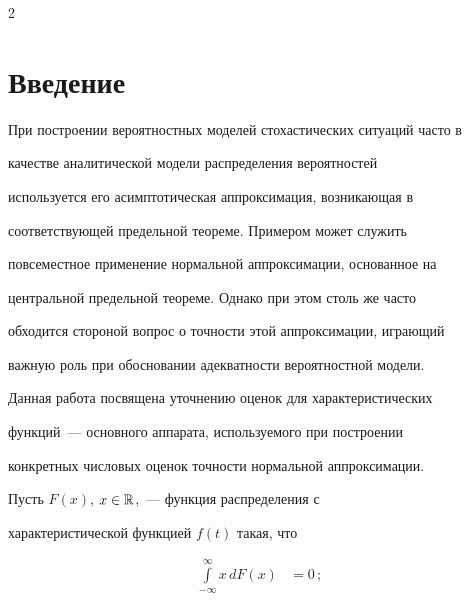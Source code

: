       \begin{multicols}{2}



      \label{st\stat}



\section{Введение}

\vspace*{6pt}



При построении вероятностных моделей стоха\-стических ситуаций часто в

качестве аналити\-ческой модели распределения вероятностей

используется его асимптотическая аппроксимация, воз\-ни\-ка\-ющая в

соответствующей предельной теореме. Примером может служить

повсеместное применение нормальной аппроксимации, основанное на

центральной предельной теореме. Однако при этом столь же часто

обходится стороной вопрос о точ\-ности этой аппроксимации, играющий

важную роль при обосновании адекватности вероятностной модели.

Данная работа посвящена уточнению оценок для характеристических

функций~--- основного аппарата, используемого при построении

конкретных числовых оценок точности нормальной аппроксимации.



Пусть $F(x)$, $x\in\mathbb R$,~--- функция распределения с

характеристической функцией $f(t)$ такая, что



\vspace*{6pt}



\noindent

\begin{equation}

\left.

\begin{array}{rl}

\displaystyle\int\limits_{-\infty}^\infty x\,dF(x)&=0\,;\\


\end{array}
\end{equation}
\end{multicols}
